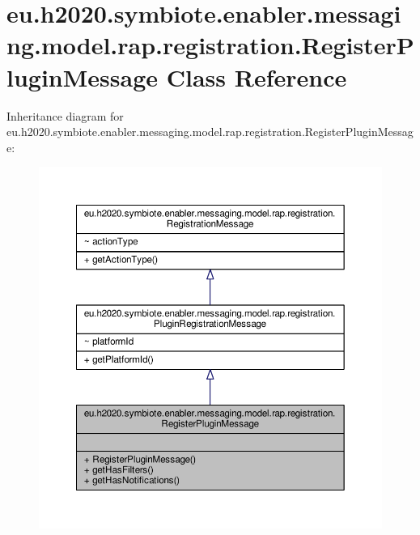 \hypertarget{classeu_1_1h2020_1_1symbiote_1_1enabler_1_1messaging_1_1model_1_1rap_1_1registration_1_1RegisterPluginMessage}{}\section{eu.\+h2020.\+symbiote.\+enabler.\+messaging.\+model.\+rap.\+registration.\+Register\+Plugin\+Message Class Reference}
\label{classeu_1_1h2020_1_1symbiote_1_1enabler_1_1messaging_1_1model_1_1rap_1_1registration_1_1RegisterPluginMessage}


Inheritance diagram for eu.\+h2020.\+symbiote.\+enabler.\+messaging.\+model.\+rap.\+registration.\+Register\+Plugin\+Message\+:
\nopagebreak
\begin{figure}[H]
\begin{center}
\leavevmode
\includegraphics[width=350pt]{classeu_1_1h2020_1_1symbiote_1_1enabler_1_1messaging_1_1model_1_1rap_1_1registration_1_1RegisterPluginMessage__inherit__graph}
\end{center}
\end{figure}


